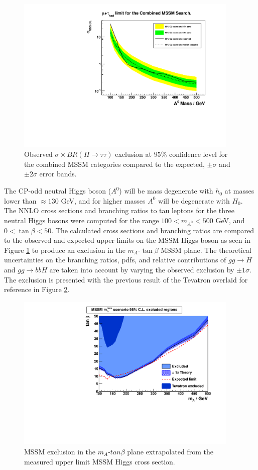 \begin{figure}[ht]
\centering
\includegraphics[width=0.95\textwidth]{plots/limitsAHtoMuTau_svFit_mssm.pdf}
\caption{Observed $\sigma\times BR(H\rightarrow\tau\tau)$ exclusion at $95\%$ confidence level for the combined MSSM categories compared to the expected, $\pm\sigma$ and $\pm 2\sigma$ error bands.}
\label{fig:mssmlimits}
\end{figure}

The CP-odd neutral Higgs boson ($A^{0}$) will be mass degenerate with $h_{0}$ at masses lower than $\approx 130$ GeV, and for higher masses $A^{0}$ will be degenerate with $H_{0}$.
The NNLO cross sections and branching ratios to tau leptons for the three neutral Higgs bosons were computed for the range $100 < m_{A^{0}} < 500$ GeV, and $0 < \tan\beta < 50$.
The calculated cross sections and branching ratios are compared to the observed and expected upper limits on the MSSM Higgs boson as seen in Figure \ref{fig:mssmlimits} to produce an exclusion in the $m_{A}$-$\tan\beta$ MSSM plane.
The theoretical uncertainties on the branching ratios, pdfs, and relative contributions of $gg\rightarrow H$ and $gg\rightarrow bbH$ are taken into account by varying the observed exclusion by $\pm1\sigma$.
The exclusion is presented with the previous result of the Tevatron overlaid for reference in Figure \ref{fig:tanbeta}.

\begin{figure}[tpb]
\centering
\centerline{\includegraphics[width=0.95\textwidth]{plots/tan_beta.pdf}}
\caption{
  MSSM exclusion in the $m_{A}$-$tan\beta$ plane extrapolated from the measured upper limit MSSM Higgs cross section.
}
\label{fig:tanbeta}
\end{figure}

